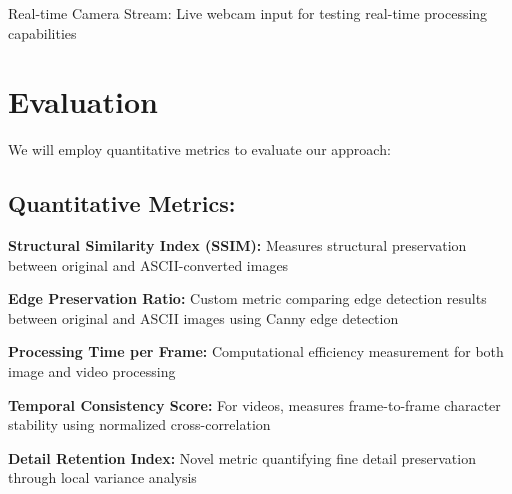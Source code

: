 \documentclass[10pt,twocolumn,letterpaper]{article}
\begin{document}
Real-time Camera Stream: Live webcam input for testing real-time processing capabilities

\section{Evaluation}

We will employ quantitative metrics to evaluate our approach:

\subsection{Quantitative Metrics:}

\textbf{Structural Similarity Index (SSIM):} Measures structural preservation between original and ASCII-converted images

\textbf{Edge Preservation Ratio:} Custom metric comparing edge detection results between original and ASCII images using Canny edge detection

\textbf{Processing Time per Frame:} Computational efficiency measurement for both image and video processing

\textbf{Temporal Consistency Score:} For videos, measures frame-to-frame character stability using normalized cross-correlation

\textbf{Detail Retention Index:} Novel metric quantifying fine detail preservation through local variance analysis


{\small


}
\end{document}
